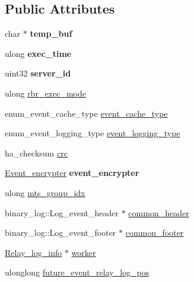 \subsection*{Public Attributes}
\begin{DoxyCompactItemize}
\item 
\mbox{\label{classLog__event_ad15ec5c07bd62d2d6d0b01552ba277b0}} 
char $\ast$ {\bfseries temp\+\_\+buf}
\item 
\mbox{\label{classLog__event_aba723df706374f55355634b81eba94ed}} 
ulong {\bfseries exec\+\_\+time}
\item 
\mbox{\label{classLog__event_a2fa4142b4e8425a9782563b5f06305ae}} 
uint32 {\bfseries server\+\_\+id}
\item 
ulong \mbox{\hyperlink{classLog__event_a92b745a1eabd89fb67b1f7c4d626d689}{rbr\+\_\+exec\+\_\+mode}}
\item 
enum\+\_\+event\+\_\+cache\+\_\+type \mbox{\hyperlink{classLog__event_a243eff824952a8d0021ef80e845945fe}{event\+\_\+cache\+\_\+type}}
\item 
enum\+\_\+event\+\_\+logging\+\_\+type \mbox{\hyperlink{classLog__event_ac72fee64ecfbb10396489f82fc28ed1d}{event\+\_\+logging\+\_\+type}}
\item 
ha\+\_\+checksum \mbox{\hyperlink{classLog__event_a39cb75b9f87ead22ad5a3971946e30c0}{crc}}
\item 
\mbox{\label{classLog__event_a6a73a55a888e4e1efedbd72657e39ef7}} 
\mbox{\hyperlink{classEvent__encrypter}{Event\+\_\+encrypter}} {\bfseries event\+\_\+encrypter}
\item 
ulong \mbox{\hyperlink{classLog__event_a0c7bd9c306af3c715de88e246241db9b}{mts\+\_\+group\+\_\+idx}}
\item 
binary\+\_\+log\+::\+Log\+\_\+event\+\_\+header $\ast$ \mbox{\hyperlink{classLog__event_ac9c5b6494544de6b569351b919f75d57}{common\+\_\+header}}
\item 
binary\+\_\+log\+::\+Log\+\_\+event\+\_\+footer $\ast$ \mbox{\hyperlink{classLog__event_a1280a16e7f198401154ea83667b9d0d7}{common\+\_\+footer}}
\item 
\mbox{\hyperlink{classRelay__log__info}{Relay\+\_\+log\+\_\+info}} $\ast$ \mbox{\hyperlink{classLog__event_a8a1eeab37171617a328e2f62d7130def}{worker}}
\item 
ulonglong \mbox{\hyperlink{classLog__event_a6c443026bb826f7743d090ec1a5dec40}{future\+\_\+event\+\_\+relay\+\_\+log\+\_\+pos}}
\end{DoxyCompactItemize}
